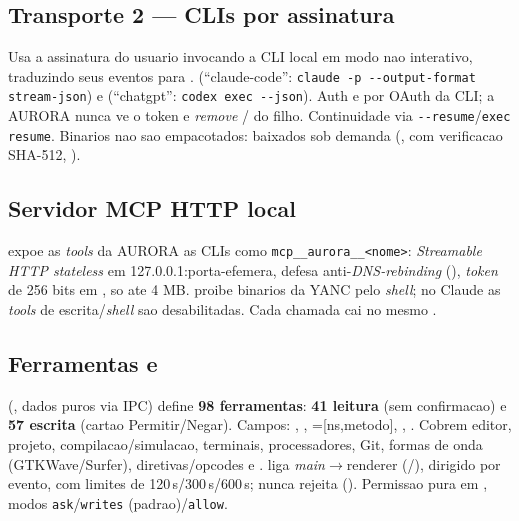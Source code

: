 \subsection{Transporte 2 --- CLIs por assinatura}
Usa a assinatura do usuario invocando a CLI local em modo nao interativo, traduzindo seus eventos para .  (\enquote{claude-code}: \lstinline|claude -p --output-format stream-json|) e  (\enquote{chatgpt}: \lstinline|codex exec --json|). Auth e por OAuth da CLI; a AURORA nunca ve o token e \emph{remove} / do filho. Continuidade via \lstinline|--resume|/\lstinline|exec resume|. Binarios nao sao empacotados: baixados sob demanda (,  com verificacao SHA-512, ).

\subsection{Servidor MCP HTTP local}
 expoe as \emph{tools} da AURORA as CLIs como \lstinline|mcp__aurora__<nome>|: \emph{Streamable HTTP stateless} em 127.0.0.1:porta-efemera, defesa anti-\emph{DNS-rebinding} (), \emph{token} de 256 bits em , so  ate 4 MB.  proibe binarios da YANC pelo \emph{shell}; no Claude as \emph{tools} de escrita/\emph{shell} sao desabilitadas. Cada chamada cai no mesmo .

\subsection{Ferramentas e }
 (, dados puros via IPC) define \textbf{98 ferramentas}: \textbf{41 leitura} (sem confirmacao) e \textbf{57 escrita} (cartao Permitir/Negar). Campos: , , =[ns,metodo], , . Cobrem editor, projeto, compilacao/simulacao, terminais, processadores, Git, formas de onda (GTKWave/Surfer), diretivas/opcodes e .  liga \emph{main}$\rightarrow$renderer (/), dirigido por evento, com limites de 120\,s/300\,s/600\,s; nunca rejeita (). Permissao pura em , modos \lstinline|ask|/\lstinline|writes| (padrao)/\lstinline|allow|.

